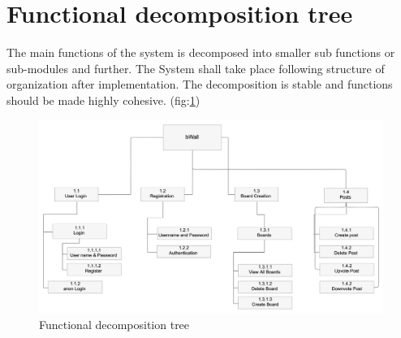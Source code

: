 \documentclass[12pt]{report}
\begin{document}
\section{Functional decomposition tree}
The main functions of the system is decomposed into smaller sub functions or sub-modules and further. The System shall take place following structure of organization after implementation. The decomposition is stable and functions should be made highly cohesive. (fig:\ref{fig:tree})
\begin{figure}[H]
\centering
\includegraphics[width=15cm]{Tree.png}
\caption{Functional decomposition tree}
\label{fig:tree}
\end{figure}
\end{document}
